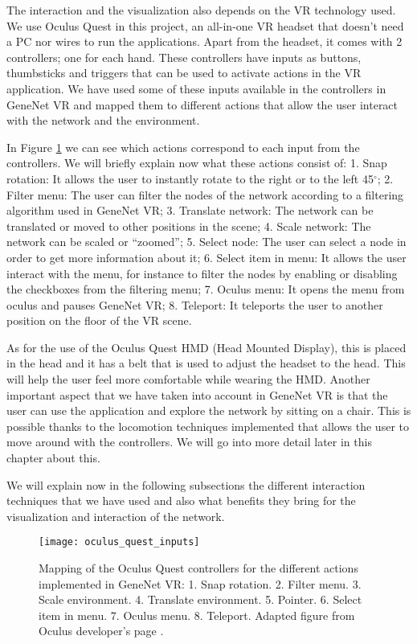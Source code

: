 The interaction and the visualization also depends on the VR technology used. We use Oculus Quest in this project, an all-in-one VR headset that doesn't need a PC nor wires to run the applications. Apart from the headset, it comes with 2 controllers; one for each hand. These controllers have inputs as buttons, thumbsticks and triggers that can be used to activate actions in the VR application. We have used some of these inputs available in the controllers in GeneNet VR and mapped them to different actions that allow the user interact with the network and the environment.

In Figure \ref{fig:oculus_quest_inputs} we can see which actions correspond to each input from the controllers. We will briefly explain now what these actions consist of: 1. Snap rotation: It allows the user to instantly rotate to the right or to the left 45$^{\circ}$; 2. Filter menu: The user can filter the nodes of the network according to a filtering algorithm used in GeneNet VR; 3. Translate network: The network can be translated or moved to other positions in the scene; 4. Scale network: The network can be scaled or “zoomed”; 5. Select node: The user can select a node in order to get more information about it; 6. Select item in menu: It allows the user interact with the menu, for instance to filter the nodes by enabling or disabling the checkboxes from the filtering menu; 7. Oculus menu: It opens the menu from oculus and pauses GeneNet VR; 8. Teleport: It teleports the user to another position on the floor of the VR scene.

As for the use of the Oculus Quest HMD (Head Mounted Display), this is placed in the head and it has a belt that is used to adjust the headset to the head. This will help the user feel more comfortable while wearing the HMD. Another important aspect that we have taken into account in GeneNet VR is that the user can use the application and explore the network by sitting on a chair. This is possible thanks to the locomotion techniques implemented that allows the user to move around with the controllers. We will go into more detail later in this chapter about this.

We will explain now in the following subsections the different interaction techniques that we have used and also what benefits they bring for the visualization and interaction of the network.

\begin{figure}[h!]
    \centering%
    \texttt{[image: oculus\_quest\_inputs]}
    \caption{Mapping of the Oculus Quest controllers for the different actions implemented in GeneNet VR: 1. Snap rotation. 2. Filter menu. 3. Scale environment. 4. Translate environment. 5. Pointer. 6. Select item in menu. 7. Oculus menu. 8. Teleport. Adapted figure from Oculus developer's page \cite{oculus_inputs}.}
    \label{fig:oculus_quest_inputs}
\end{figure}%

